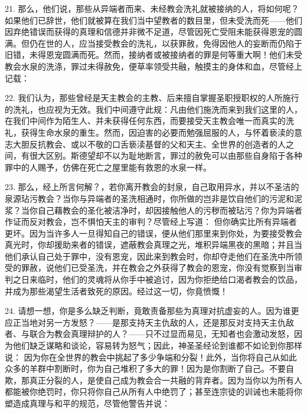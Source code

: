 21. 那么，他们说，那些从异端者而来、未经教会洗礼就被接纳的人，将如何呢？如果他们已辞世，他们就被算在我们当中望教者的数目里，但未受洗而死——他们因弃绝错误而获得的真理和信德并非微不足道，尽管因死亡受阻未能获得恩宠的圆满。但仍在世的人，应当接受教会的洗礼，以获罪赦，免得因他人的妄断而仍陷于旧错，未得恩宠圆满而死。然而，接纳者或被接纳者的罪是何等重大啊！他们未受教会水泉的洗涤，罪过未得赦免，便草率领受共融，触摸主的身体和血，尽管经上记载： \par

22. 我们认为，那些曾经是天主教会的主教、后来擅自掌握圣职授职权的人所施行的洗礼，也应视为无效。我们中间遵守此规：凡由他们施洗而来到我们这里的人，在我们中间作为陌生人、并未获得任何东西，而要接受天主教会唯一而真实的洗礼，获得生命水泉的重生。然而，因迫害的必要而勉强屈服的人，与怀着亵渎的意志大胆反抗教会、或以不敬的口舌亵渎基督的父和天主、全世界的创造者的人之间，有很大区别。斯德望却不以为耻地断言，罪过的赦免可以由那些自身陷于各种罪中的人赐予，仿佛在死亡之屋里能有救恩的水泉一样。\par

23. 那么，经上所言何解？，若你离开教会的封泉，自己取用异水，并以不圣洁的泉源玷污教会？当你与异端者的圣洗相通时，你所做的岂非是饮自他们的污泥和泥浆？当你自己藉教会的圣化被洁净时，却因接触他人的污秽而被玷污？你为异端者作证而反对教会，岂不惧怕天主的审判？尽管经上写道： 但你确实比所有异端者更坏。因为当许多人一旦得知自己的错误，便从他们那里来到你处，为要接受教会真光时，你却援助来者的错误，遮蔽教会真理之光，堆积异端黑夜的黑暗；并且当他们承认自己处于罪中，没有恩宠，因此来到教会时，你却夺走他们在圣洗中所领受的罪赦，说他们已受圣洗，并在教会之外获得了教会的恩宠，你没有觉察到当审判之日来临时，他们的灵魂将从你手中被追讨，因为你拒绝给口渴者教会的饮品，并成为那些渴望生活者致死的原因。经过这一切，你竟愤慨！\par

24. 请想一想，你是多么缺乏判断，竟敢责备那些为真理对抗虚妄的人。因为谁更应正当地对另一方发怒？——是那支持天主仇敌的人，还是那反对支持天主仇敌者、与联合为教会真理辩护的人？——只不过显而易见，无知者也会激动发怒，因为他们缺乏谋略和谈论，容易转为怒气；因此，神圣圣经论到谁都不如论到你那样说： 因为你在全世界的教会中挑起了多少争端和分裂！此外，当你将自己从如此众多的羊群中割断时，你为自己堆积了多大的罪！因为是你割断了自己。不要自欺，那真正分裂的人，是使自己成为教会合一共融的背弃者。因为当你以为所有人都能被你绝罚时，你只将你自己从所有人中绝罚了；甚至连宗徒的训诫也未能将你塑造成真理与和平的规范，尽管他警告并说：\par

